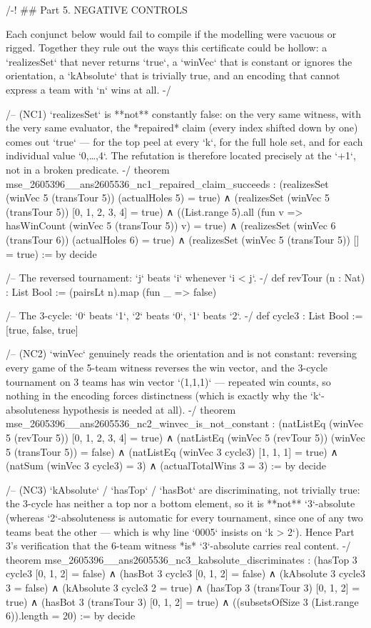 \documentclass[11pt]{article}
\begin{document}
\begin{Vlean}
/-! ## Part 5. NEGATIVE CONTROLS

Each conjunct below would fail to compile if the modelling were vacuous or rigged.  Together
they rule out the ways this certificate could be hollow: a `realizesSet` that never returns
`true`, a `winVec` that is constant or ignores the orientation, a `kAbsolute` that is
trivially true, and an encoding that cannot express a team with `n` wins at all. -/

/-- (NC1) `realizesSet` is **not** constantly false: on the very same witness, with the very
same evaluator, the *repaired* claim (every index shifted down by one) comes out `true` — for
the top peel at every `k`, for the full hole set, and for each individual value `0,…,4`.  The
refutation is therefore located precisely at the `+1`, not in a broken predicate. -/
theorem mse_2605396__ans2605536_nc1_repaired_claim_succeeds :
    (realizesSet (winVec 5 (transTour 5)) (actualHoles 5) = true)
  ∧ (realizesSet (winVec 5 (transTour 5)) [0, 1, 2, 3, 4] = true)
  ∧ ((List.range 5).all (fun v => hasWinCount (winVec 5 (transTour 5)) v) = true)
  ∧ (realizesSet (winVec 6 (transTour 6)) (actualHoles 6) = true)
  ∧ (realizesSet (winVec 5 (transTour 5)) [] = true) := by decide

/-- The reversed tournament: `j` beats `i` whenever `i < j`. -/
def revTour (n : Nat) : List Bool := (pairsLt n).map (fun _ => false)

/-- The 3-cycle: `0` beats `1`, `2` beats `0`, `1` beats `2`. -/
def cycle3 : List Bool := [true, false, true]

/-- (NC2) `winVec` genuinely reads the orientation and is not constant: reversing every game
of the 5-team witness reverses the win vector, and the 3-cycle tournament on 3 teams has win
vector `(1,1,1)` — repeated win counts, so nothing in the encoding forces distinctness (which
is exactly why the `k`-absoluteness hypothesis is needed at all). -/
theorem mse_2605396__ans2605536_nc2_winvec_is_not_constant :
    (natListEq (winVec 5 (revTour 5)) [0, 1, 2, 3, 4] = true)
  ∧ (natListEq (winVec 5 (revTour 5)) (winVec 5 (transTour 5)) = false)
  ∧ (natListEq (winVec 3 cycle3) [1, 1, 1] = true)
  ∧ (natSum (winVec 3 cycle3) = 3)
  ∧ (actualTotalWins 3 = 3) := by decide

/-- (NC3) `kAbsolute` / `hasTop` / `hasBot` are discriminating, not trivially true: the
3-cycle has neither a top nor a bottom element, so it is **not** `3`-absolute (whereas
`2`-absoluteness is automatic for every tournament, since one of any two teams beat the
other — which is why line `0005` insists on `k > 2`).  Hence Part 3's verification
that the 6-team witness *is* `3`-absolute carries real content. -/
theorem mse_2605396__ans2605536_nc3_kabsolute_discriminates :
    (hasTop 3 cycle3 [0, 1, 2] = false)
  ∧ (hasBot 3 cycle3 [0, 1, 2] = false)
  ∧ (kAbsolute 3 cycle3 3 = false)
  ∧ (kAbsolute 3 cycle3 2 = true)
  ∧ (hasTop 3 (transTour 3) [0, 1, 2] = true)
  ∧ (hasBot 3 (transTour 3) [0, 1, 2] = true)
  ∧ ((subsetsOfSize 3 (List.range 6)).length = 20) := by decide


\end{Vlean}
\end{document}
